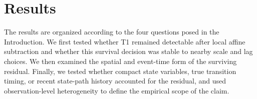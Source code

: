 \section{Results}

The results are organized according to the four questions posed in the
Introduction. We first tested whether T1 remained detectable after local
affine subtraction and whether this survival decision was stable to nearby
scale and lag choices. We then examined the spatial and event-time form of the
surviving residual. Finally, we tested whether compact state variables, true
transition timing, or recent state-path history accounted for the residual,
and used observation-level heterogeneity to define the empirical scope of the
claim.






